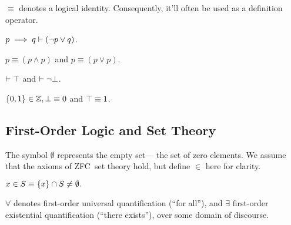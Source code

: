 $\equiv$ denotes a logical identity.
Consequently,
  it'll often be used as a definition operator.

\begin{definition}[Implication]
  $p\implies q \vdash (\neg p \lor q)$.
\end{definition}

\begin{definition}[Tautologies]
  $p\equiv (p\land p)$ and $p\equiv (p\lor p)$.
\end{definition}

%
%
\begin{definition}
  $\vdash\top$ and $\vdash\neg\bot$.
\end{definition}

\indexsym{}
%
\begin{definition}
  $\left\{0,1\right\}\in\mathbb{Z}, \bot \equiv 0$ and $\top \equiv 1$.
\end{definition}


\subsection{First-Order Logic and Set Theory}
\indexsym{}
The symbol $\emptyset$ represents the empty set---%
  the set of zero elements.
We assume that the axioms of ZFC~set theory hold,
  but define $\in$ here for clarity.

\indexsym{}
\indexsym{}
\indexsym{}
\begin{definition}
  $x \in S \equiv \left\{x\right\} \cap S \not= \emptyset.$
\end{definition}

$\forall$ denotes first-order universal quantification (``for all''),
  and $\exists$ first-order existential quantification (``there exists''),
  over some domain of discourse.

